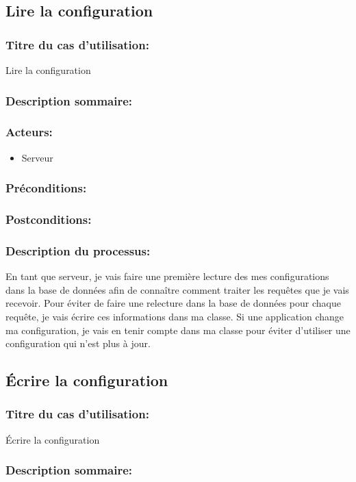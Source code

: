 \documentclass{scrreprt}
\begin{document}
\begin{itemizen}
\subsection{Lire la configuration}
\subsubsection{Titre du cas d'utilisation:} Lire la configuration
\subsubsection{Description sommaire:}
\subsubsection{Acteurs:}
\begin{itemize}
    \item Serveur
\end{itemize}
\subsubsection{Préconditions:}
\subsubsection{Postconditions:}
\subsubsection{Description du processus:}En tant que serveur, je vais faire une première lecture des mes configurations dans la base de données afin de connaître comment traiter les requêtes que je vais recevoir.
Pour éviter de faire une relecture dans la base de données pour chaque requête,
je vais écrire ces informations dans ma classe.
Si une application change ma configuration, je vais en tenir compte dans ma
classe pour éviter d'utiliser une configuration qui n'est plus à jour.

\subsection{Écrire la configuration}
\subsubsection{Titre du cas d'utilisation:} Écrire la configuration
\subsubsection{Description sommaire:}

\end{itemizen}
\end{document}
